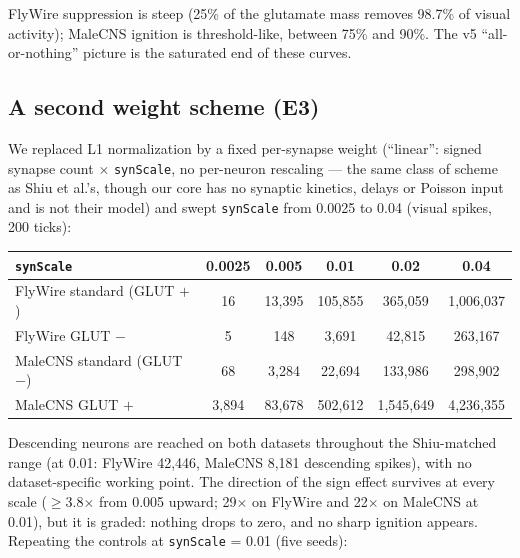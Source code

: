 \documentclass[11pt,a4paper]{article}
\begin{document}
FlyWire suppression is steep (25\% of the glutamate mass removes 98.7\% of
visual activity); MaleCNS ignition is threshold-like, between 75\% and 90\%.
The v5 ``all-or-nothing'' picture is the saturated end of these curves.

\subsection{A second weight scheme (E3)}

We replaced L1 normalization by a fixed per-synapse weight (``linear'': signed
synapse count $\times$ \texttt{synScale}, no per-neuron rescaling --- the same
class of scheme as Shiu et al.'s, though our core has no synaptic kinetics,
delays or Poisson input and is not their model) and swept \texttt{synScale}
from 0.0025 to 0.04 (visual spikes, 200 ticks):

\begin{center}
\footnotesize
\begin{tabular}{lccccc}
\toprule
\texttt{synScale} & 0.0025 & 0.005 & 0.01 & 0.02 & 0.04 \\
\midrule
FlyWire standard (GLUT $+$) & 16 & 13,395 & 105,855 & 365,059 & 1,006,037 \\
FlyWire GLUT $-$ & 5 & 148 & 3,691 & 42,815 & 263,167 \\
MaleCNS standard (GLUT $-$) & 68 & 3,284 & 22,694 & 133,986 & 298,902 \\
MaleCNS GLUT $+$ & 3,894 & 83,678 & 502,612 & 1,545,649 & 4,236,355 \\
\bottomrule
\end{tabular}
\end{center}

Descending neurons are reached on both datasets throughout the
Shiu-matched range (at 0.01: FlyWire 42,446, MaleCNS 8,181 descending
spikes), with no dataset-specific working point. The direction of the sign
effect survives at every scale ($\ge$3.8$\times$ from 0.005 upward; 29$\times$
on FlyWire and 22$\times$ on MaleCNS at 0.01), but it is graded: nothing
drops to zero, and no sharp ignition appears. Repeating the controls at
\texttt{synScale} = 0.01 (five seeds):
\end{document}
